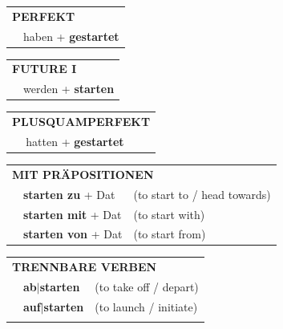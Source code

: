 \documentclass[10pt,a4paper]{revtex4-2}
\begin{document}
\begin{verbbox}
 \begin{tabular}{rl}
     \multicolumn{2}{l}{\textbf{PERFEKT}}\\
   & haben + \textbf{gestartet}\\
  \end{tabular}
\hfill
\begin{tabular}{rl}
    \multicolumn{2}{l}{\textbf{FUTURE I}}\\
   & werden + \textbf{starten}\\
  \end{tabular}
\hfill
\begin{tabular}{rl}
    \multicolumn{2}{l}{\textbf{PLUSQUAMPERFEKT}}\\
   & hatten + \textbf{gestartet}\\
  \end{tabular}

 \vspace{10pt}

\begin{tabular}{lll}
      \multicolumn{3}{l}{\textbf{MIT PRÄPOSITIONEN}}\\
& \textbf{starten zu} + Dat & (to start to / head towards)\\
& \textbf{starten mit} + Dat & (to start with)\\
& \textbf{starten von} + Dat & (to start from)\\
\end{tabular}
  \hfill
\begin{tabular}{lll}
      \multicolumn{3}{l}{\textbf{TRENNBARE VERBEN}}\\
 & \textbf{ab$|$starten} & (to take off / depart)\\
 & \textbf{auf$|$starten} & (to launch / initiate)\\
\vspace{10pt}
  \end{tabular}


\vspace{-5pt}
\end{verbbox}
\end{document}

